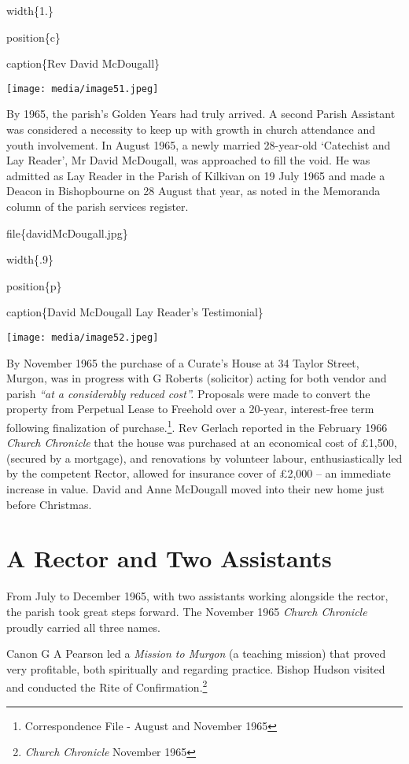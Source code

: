 width\{1.\}

position\{c\}

caption\{Rev David McDougall\}

\texttt{[image: media/image51.jpeg]}

By 1965, the parish's Golden Years had truly arrived. A second Parish Assistant was considered a necessity to keep up with growth in church attendance and youth involvement. In August 1965, a newly married 28-year-old `Catechist and Lay Reader', Mr David McDougall, was approached to fill the void. He was admitted as Lay Reader in the Parish of Kilkivan on 19 July 1965 and made a Deacon in Bishopbourne on 28 August that year, as noted in the Memoranda column of the parish services register.

file\{davidMcDougall.jpg\}

width\{.9\}

position\{p\}

caption\{David McDougall Lay Reader's Testimonial\}

\texttt{[image: media/image52.jpeg]}

By November 1965 the purchase of a Curate's House at 34 Taylor Street, Murgon, was in progress with G Roberts (solicitor) acting for both vendor and parish \emph{``at a considerably reduced cost''.} Proposals were made to convert the property from Perpetual Lease to Freehold over a 20-year, interest-free term following finalization of purchase.\footnote{Correspondence File - August and November 1965}. Rev Gerlach reported in the February 1966 \emph{Church Chronicle} that the house was purchased at an economical cost of £1,500, (secured by a mortgage), and renovations by volunteer labour, enthusiastically led by the competent Rector, allowed for insurance cover of £2,000 -- an immediate increase in value. David and Anne McDougall moved into their new home just before Christmas.

\hypertarget{a-rector-and-two-assistants}{%
\section{A Rector and Two Assistants}\label{a-rector-and-two-assistants}}

From July to December 1965, with two assistants working alongside the rector, the parish took great steps forward. The November 1965 \emph{Church Chronicle} proudly carried all three names.

Canon G A Pearson led a \emph{Mission to Murgon} (a teaching mission) that proved very profitable, both spiritually and regarding practice. Bishop Hudson visited and conducted the Rite of Confirmation.\footnote{\emph{Church Chronicle} November 1965}

